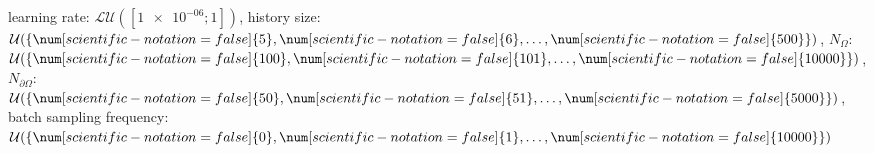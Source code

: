 learning rate: $\mathcal{LU}([\num[scientific-notation=true]{1e-06}; \num[scientific-notation=false]{1}])$, history size: $\mathcal{U}(\{\num[scientific-notation=false]{5},\num[scientific-notation=false]{6},\text{\dots},\num[scientific-notation=false]{500}\})$, $N_{\Omega}$: $\mathcal{U}(\{\num[scientific-notation=false]{100},\num[scientific-notation=false]{101},\text{\dots},\num[scientific-notation=false]{10000}\})$, $N_{\partial\Omega}$: $\mathcal{U}(\{\num[scientific-notation=false]{50},\num[scientific-notation=false]{51},\text{\dots},\num[scientific-notation=false]{5000}\})$, batch sampling frequency: $\mathcal{U}(\{\num[scientific-notation=false]{0},\num[scientific-notation=false]{1},\text{\dots},\num[scientific-notation=false]{10000}\})$